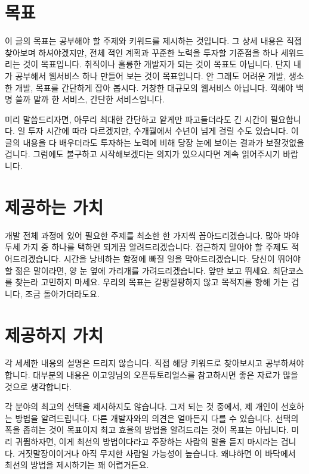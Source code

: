\documentclass[11pt,a4paper]{article}
\begin{document}
\section{목표}
이 글의 목표는 공부해야 할 주제와 키워드를 제시하는 것입니다. 그 상세 내용은 직접 찾아보며 하셔야겠지만, 전체 적인 계획과 꾸준한 노력을 투자할 기준점을 하나 세워드리는 것이 목표입니다. 취직이나 훌륭한 개발자가 되는 것이 목표도 아닙니다. 단지 내가 공부해서 웹서비스 하나 만들어 보는 것이 목표입니다. 안 그래도 어려운 개발, 생소한 개발, 목표를 간단하게 잡아 봅시다. 거창한 대규모의 웹서비스 아닙니다. 끽해야 백 명 쓸까 말까 한 서비스, 간단한 서비스입니다.

미리 말씀드리자면, 아무리 최대한 간단하고 얕게만 파고들더라도 긴 시간이 필요합니다. 일 투자 시간에 따라 다르겠지만, 수개월에서 수년이 넘게 걸릴 수도 있습니다. 이 글의 내용을 다 배우더라도 투자하는 노력에 비해 당장 눈에 보이는 결과가 보잘것없을 겁니다. 그럼에도 불구하고 시작해보겠다는 의지가 있으시다면 계속 읽어주시기 바랍니다.

\section{제공하는 가치}
개발 전체 과정에 있어 필요한 주제를 최소한 한 가지씩 꼽아드리겠습니다. 많아 봐야 두세 가지 중 하나를 택하면 되게끔 알려드리겠습니다. 접근하지 말아야 할 주제도 적어드리겠습니다. 시간을 낭비하는 함정에 빠질 일을 막아드리겠습니다. 당신이 뛰어야 할 젊은 말이라면, 양 눈 옆에 가리개를 가려드리겠습니다. 앞만 보고 뛰세요. 최단코스를 찾는라 고민하지 마세요. 우리의 목표는 갈팡질팡하지 않고 목적지를 향해 가는 겁니다, 조금 돌아가더라도요.

\section{제공하지  가치}
각 세세한 내용의 설명은 드리지 않습니다. 직접 해당 키워드로 찾아보시고 공부하셔야 합니다. 대부분의 내용은 이고잉님의 오픈튜토리얼스를 참고하시면 좋은 자료가 많을 것으로 생각합니다.

각 분야의 최고의 선택을 제시하지도 않습니다. 그저 되는 것 중에서, 제 개인이 선호하는 방법을 알려드립니다. 다른 개발자와의 의견은 얼마든지 다를 수 있습니다. 선택의 폭을 좁히는 것이 목표이지 최고 효율의 방법을 알려드리는 것이 목표는 아닙니다. 미리 귀뜀하자면, 이게 최선의 방법이다라고 주장하는 사람의 말을 듣지 마시라는 겁니다. 거짓말장이이거나 아직 무지한 사람일 가능성이 높습니다. 왜냐하면 이 바닥에서 최선의 방법을 제시하기는 꽤 어렵거든요.
\end{document}
